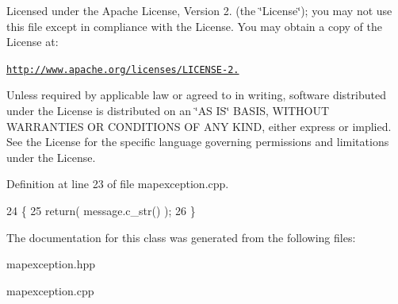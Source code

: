 Licensed under the Apache License, Version 2. (the \char`\"{}\+License\char`\"{}); you may not use this file except in compliance with the License. You may obtain a copy of the License at\+:

\href{http://www.apache.org/licenses/LICENSE-2.0}{\tt http\+://www.\+apache.\+org/licenses/\+L\+I\+C\+E\+N\+S\+E-\/2.}

Unless required by applicable law or agreed to in writing, software distributed under the License is distributed on an \char`\"{}\+A\+S I\+S\char`\"{} B\+A\+S\+IS, W\+I\+T\+H\+O\+UT W\+A\+R\+R\+A\+N\+T\+I\+ES OR C\+O\+N\+D\+I\+T\+I\+O\+NS OF A\+NY K\+I\+ND, either express or implied. See the License for the specific language governing permissions and limitations under the License. 

Definition at line 23 of file mapexception.\+cpp.


\begin{DoxyCode}
24 \{
25    \textcolor{keywordflow}{return}( message.c\_str() );
26 \}
\end{DoxyCode}


The documentation for this class was generated from the following files\+:\begin{DoxyCompactItemize}
\item 
mapexception.\+hpp\item 
mapexception.\+cpp\end{DoxyCompactItemize}
